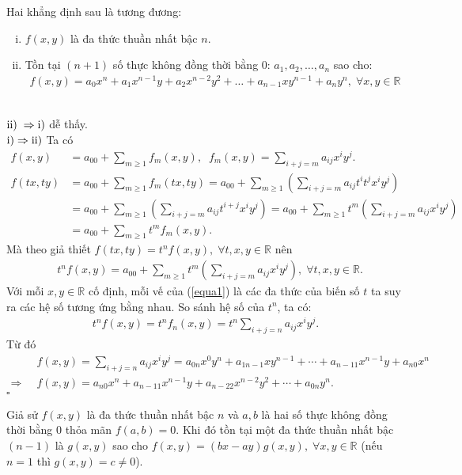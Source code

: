 \begin{dl}
Hai khẳng định sau là tương đương:
\begin{enumerate}[i)]
\item  $f(x,y)$ là đa thức thuần nhất bậc  $n$.
\item   Tồn tại $(n+1)$  số thực không đồng thời bằng 0: $a_1,a_2,\hdots, a_n$  sao cho:  
\begin{align*}
f(x,y)=a_0x^n+a_1x^{n-1}y+a_2x^{n-2}y^2+ \hdots +a_{n-1}xy^{n-1}+a_ny^n,\;\forall x,y\in \mathbb{R}
\end{align*}
\end{enumerate}
\end{dl}
 \\
$\rm ii)\;\Rightarrow i)$ dễ thấy.\\
$\rm i)\Rightarrow ii)$ Ta có
\begin{align*}
f(x,y)&=a_{00}+\sum_{m\ge 1}f_m(x,y),\;\;f_m(x,y)=\sum_{i+j=m}a_{ij}x^iy^j.\\
f(tx,ty)&=a_{00}+\sum_{m\ge 1}f_m(tx,ty)=a_{00}+\sum_{m\ge 1}\left(\sum_{i+j=m}a_{ij}t^it^jx^iy^j\right)\\
&=a_{00}+\sum_{m\ge 1}\left(\sum_{i+j=m}a_{ij}t^{i+j}x^iy^j\right)=a_{00}+\sum_{m\ge 1}t^m\left(\sum_{i+j=m}a_{ij}x^iy^j\right)\\
&=a_{00}+\sum_{m\ge 1}t^mf_m(x,y).
\end{align*}
Mà theo giả thiết $f(tx,ty)=t^nf(x,y),\;\forall t,x,y\in \mathbb{R}$ nên
\begin{align}\label{equa1}
& t^nf(x,y)=a_{00}+\sum_{m\ge 1}t^m\left(\sum_{i+j=m}a_{ij}x^iy^j\right),\;\forall t,x,y\in \mathbb{R}.
\end{align}
Với mỗi $x,y\in\mathbb{R}$  cố định, mỗi vế của (\ref{equa1}) là các đa thức của biến số $t$  ta suy ra các hệ số tương ứng bằng nhau. So sánh hệ số của  $t^n$, ta có:
\begin{align*}
t^nf(x,y)=t^nf_n(x,y)=t^n\sum_{i+j=n}a_{ij}x^iy^j.
\end{align*}
Từ đó
\begin{align*}
&f(x,y)=\sum_{i+j=n}a_{ij}x^iy^j=a_{0n}x^0y^n+a_{1n-1}xy^{n-1}+\cdots +a_{n-11}x^{n-1}y+a_{n0}x^n\\
\Rightarrow\;\;&f(x,y)=a_{n0}x^n+a_{n-11}x^{n-1}y+a_{n-22}x^{n-2}y^2+\cdots +a_{0n}y^n.
\end{align*}\hfill$\square$
\begin{dl}
Giả sử $f(x, y)$  là đa thức thuần nhất bậc $n$  và $a,b$  là hai số thực không đồng thời bằng $0$  thỏa mãn $f(a,b)=0$. Khi đó tồn tại một đa thức thuần nhất bậc $(n-1)$  là $g(x,y)$  sao cho $f(x,y)=(bx-ay)g(x,y),\;\forall x,y\in\mathbb{R}$ (nếu $n=1$ thì $g(x,y)=c\ne 0$).
\end{dl}
